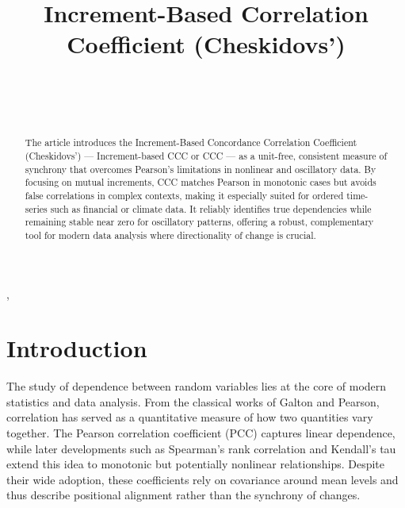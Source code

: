 \documentclass[aos]{imsart}
\begin{document}
\begin{frontmatter}

\title{Increment-Based Correlation Coefficient (Cheskidovs’)}



\begin{aug}

\author[A]{~},
\author[B]{~}

\address[A]{Independent Researcher}
\address[B]{Ural Federal University, Yekaterinburg, Russia}
\end{aug}

\begin{abstract}
The article introduces the Increment-Based Concordance Correlation Coefficient (Cheskidovs’) — Increment-based CCC or CCC — as a unit-free, consistent measure of synchrony that overcomes Pearson’s limitations in nonlinear and oscillatory data. By focusing on mutual increments, CCC matches Pearson in monotonic cases but avoids false correlations in complex contexts, making it especially suited for ordered time-series such as financial or climate data. It reliably identifies true dependencies while remaining stable near zero for oscillatory patterns, offering a robust, complementary tool for modern data analysis where directionality of change is crucial.
\end{abstract}

\begin{keyword}[class=MSC]
\end{keyword}

\begin{keyword}
\end{keyword}

\end{frontmatter}


\section{Introduction}
The study of dependence between random variables lies at the core of modern statistics and data analysis. From the classical works of Galton and Pearson, correlation has served as a quantitative measure of how two quantities vary together. The Pearson correlation coefficient (PCC) captures linear dependence, while later developments such as Spearman’s rank correlation and Kendall’s tau extend this idea to monotonic but potentially nonlinear relationships. Despite their wide adoption, these coefficients rely on covariance around mean levels and thus describe positional alignment rather than the synchrony of changes.
\end{document}

